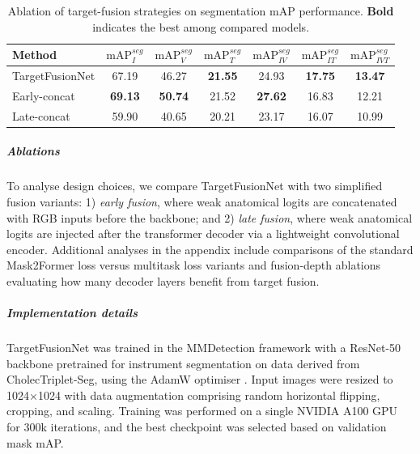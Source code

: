 \documentclass[pdflatex,sn-mathphys-num]{sn-jnl}%
\newcommand{\mAP}{\textrm{mAP}}
\newcommand{\mysubsection}[1]{\subparagraph{#1}}
\theoremstyle{thmstyleone}%
\theoremstyle{thmstyletwo}%
\theoremstyle{thmstylethree}%
\begin{document}
\begin{table}[t]
\centering
\caption{Ablation of target-fusion strategies on segmentation mAP performance. \textbf{Bold} indicates the best among compared models.}
\label{tab:ablation_seg}
\begin{tabular}{lcccccc}
\toprule
\textbf{Method} & $\mAP_{I}^{seg}$ & $\mAP_{V}^{seg}$ & $\mAP_{T}^{seg}$ & $\mAP_{IV}^{seg}$ & $\mAP_{IT}^{seg}$ & $\mAP_{IVT}^{seg}$ \\
\bottomrule
TargetFusionNet  & 67.19 & 46.27 & \textbf{21.55} & 24.93 & \textbf{17.75} & \textbf{13.47}\\
\hline
Early-concat  & \textbf{69.13} & \textbf{50.74 }& 21.52 & \textbf{27.62} & 16.83 & 12.21 \\
Late-concat & 59.90 & 40.65 & 20.21 & 23.17 & 16.07 & 10.99 \\
\hline
\end{tabular}
\end{table}



\mysubsection{Ablations}
To analyse design choices, we compare TargetFusionNet with two simplified fusion variants:  
1) \emph{early fusion}, where weak anatomical logits are concatenated with RGB inputs before the backbone;
and  
2) \emph{late fusion}, where weak anatomical logits are injected after the transformer decoder via a lightweight convolutional encoder.  
%
Additional analyses in the appendix include comparisons of the standard Mask2Former loss versus multitask loss variants and fusion-depth ablations evaluating how many decoder layers benefit from target fusion.

\mysubsection{Implementation details}
TargetFusionNet was trained in the MMDetection \cite{mmdetection} framework with a ResNet-50 \cite{he2016deep} backbone pretrained for instrument segmentation on data derived from CholecTriplet-Seg, using the AdamW optimiser \cite{loshchilov2017decoupled}. Input images were resized to 1024×1024 with data augmentation comprising random horizontal flipping, cropping, and scaling. Training was performed on a single NVIDIA A100 GPU for 300k iterations, and the best checkpoint was selected based on validation mask mAP. 
\end{document}
